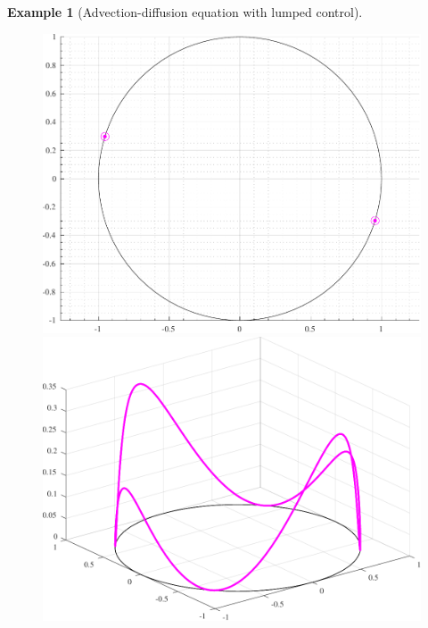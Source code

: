 \documentclass[11pt, a4paper, reqno]{amsart}
\theoremstyle{plain}
\numberwithin{equation}{section}
\newtheorem{example}{Example}[section]
\begin{document}
\begin{example}[Advection-diffusion equation with lumped control]
	\begin{figure}
	\includegraphics[scale=0.42]{figures/convect+-_opt}
	\hspace{0.1cm}
	\includegraphics[scale=0.42]{figures/convection_-+}
	\vspace{0.1cm}
	

\end{figure}
\end{example}
\end{document}
